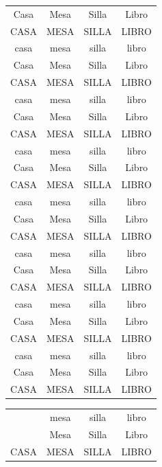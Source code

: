 \documentclass{report}
\begin{document}
\begin{longtable}[r]{cccc}
	Casa & Mesa & Silla & Libro \\
	CASA & MESA & SILLA & LIBRO \\
	casa & mesa & silla & libro \\
	Casa & Mesa & Silla & Libro \\
	CASA & MESA & SILLA & LIBRO \\
	casa & mesa & silla & libro \\
	Casa & Mesa & Silla & Libro \\
	CASA & MESA & SILLA & LIBRO \\
	casa & mesa & silla & libro \\
	Casa & Mesa & Silla & Libro \\
	CASA & MESA & SILLA & LIBRO \\
	casa & mesa & silla & libro \\
	Casa & Mesa & Silla & Libro \\
	CASA & MESA & SILLA & LIBRO \\
	casa & mesa & silla & libro \\
	Casa & Mesa & Silla & Libro \\
	CASA & MESA & SILLA & LIBRO \\
	casa & mesa & silla & libro \\
	Casa & Mesa & Silla & Libro \\
	CASA & MESA & SILLA & LIBRO \\
	casa & mesa & silla & libro \\
	Casa & Mesa & Silla & Libro \\
	CASA & MESA & SILLA & LIBRO \\
	\hline
\end{longtable}

\newpage

\begin{tabular}{|c|c|c|c|}
	\hline
\rowcolor{green} & mesa & silla & libro \\
\hhline{|>{\arrayrulecolor{green}}->{\arrayrulecolor{black}}|---}%
\rowcolor{green} \multirow{-2}{*}{HOY}& Mesa & Silla & Libro \\
	CASA & MESA & SILLA & LIBRO\\
	\hline
\end{tabular}
\end{document}

